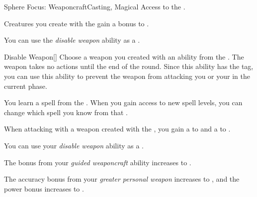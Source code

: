     \begin{feat}{Sphere Focus: Weaponcraft}{Casting, Magical}
        \featpre Access to the  .

         Creatures you create with the   gain a  bonus to .

         You can use the \textit{disable weapon} ability as a .
        \begin{freeability}{Disable Weapon}[]
            Choose a weapon you created with an ability from the  .
            The weapon takes no actions until the end of the round.
            Since this ability has the  tag, you can use this ability to prevent the weapon from attacking you or your  in the current phase.
        \end{freeability}

         You learn a spell from the  .
        When you gain access to new spell levels, you can change which spell you know from that .

         When attacking with a weapon created with the  , you gain a   to  and a   to .

         You can use your \textit{disable weapon} ability as a .

         The bonus from your \textit{guided weaponcraft} ability increases to .

         The accuracy bonus from your \textit{greater personal weapon} increases to , and the power bonus increases to .
    \end{feat}

